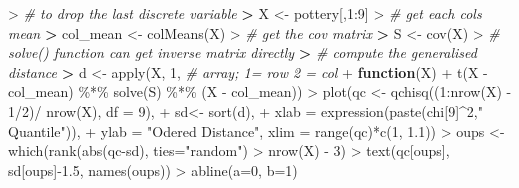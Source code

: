 \documentclass[
]{article}
\newenvironment{Shaded}{\begin{snugshade}}{\end{snugshade}}
\newcommand{\AttributeTok}[1]{\textcolor[rgb]{0.77,0.63,0.00}{#1}}
\newcommand{\CommentTok}[1]{\textcolor[rgb]{0.56,0.35,0.01}{\textit{#1}}}
\newcommand{\ControlFlowTok}[1]{\textcolor[rgb]{0.13,0.29,0.53}{\textbf{#1}}}
\newcommand{\DecValTok}[1]{\textcolor[rgb]{0.00,0.00,0.81}{#1}}
\newcommand{\ErrorTok}[1]{\textcolor[rgb]{0.64,0.00,0.00}{\textbf{#1}}}
\newcommand{\FloatTok}[1]{\textcolor[rgb]{0.00,0.00,0.81}{#1}}
\newcommand{\FunctionTok}[1]{\textcolor[rgb]{0.00,0.00,0.00}{#1}}
\newcommand{\NormalTok}[1]{#1}
\newcommand{\OtherTok}[1]{\textcolor[rgb]{0.56,0.35,0.01}{#1}}
\newcommand{\SpecialCharTok}[1]{\textcolor[rgb]{0.00,0.00,0.00}{#1}}
\newcommand{\StringTok}[1]{\textcolor[rgb]{0.31,0.60,0.02}{#1}}
\begin{document}
\begin{Shaded}
\begin{Highlighting}[]
\SpecialCharTok{\textgreater{}} \CommentTok{\# to drop the last discrete variable}
\ErrorTok{\textgreater{}}\NormalTok{ X }\OtherTok{\textless{}{-}}\NormalTok{ pottery[,}\DecValTok{1}\SpecialCharTok{:}\DecValTok{9}\NormalTok{]}
\SpecialCharTok{\textgreater{}} \CommentTok{\# get each col\textquotesingle{}s mean}
\ErrorTok{\textgreater{}}\NormalTok{ col\_mean }\OtherTok{\textless{}{-}}  \FunctionTok{colMeans}\NormalTok{(X)}
\SpecialCharTok{\textgreater{}} \CommentTok{\# get the cov matrix}
\ErrorTok{\textgreater{}}\NormalTok{ S }\OtherTok{\textless{}{-}} \FunctionTok{cov}\NormalTok{(X)}
\SpecialCharTok{\textgreater{}} \CommentTok{\# solve() function can get inverse matrix directly}
\ErrorTok{\textgreater{}} \CommentTok{\# compute the generalised distance}
\ErrorTok{\textgreater{}}\NormalTok{ d }\OtherTok{\textless{}{-}} \FunctionTok{apply}\NormalTok{(X, }\DecValTok{1}\NormalTok{, }\CommentTok{\# array; 1= row 2 = col}
\SpecialCharTok{+}            \ControlFlowTok{function}\NormalTok{(X) }
\SpecialCharTok{+}              \FunctionTok{t}\NormalTok{(X }\SpecialCharTok{{-}}\NormalTok{ col\_mean) }\SpecialCharTok{\%*\%} \FunctionTok{solve}\NormalTok{(S) }\SpecialCharTok{\%*\%}\NormalTok{ (X }\SpecialCharTok{{-}}\NormalTok{ col\_mean))}
\SpecialCharTok{\textgreater{}} \FunctionTok{plot}\NormalTok{(qc }\OtherTok{\textless{}{-}} \FunctionTok{qchisq}\NormalTok{((}\DecValTok{1}\SpecialCharTok{:}\FunctionTok{nrow}\NormalTok{(X) }\SpecialCharTok{{-}} \DecValTok{1}\SpecialCharTok{/}\DecValTok{2}\NormalTok{)}\SpecialCharTok{/} \FunctionTok{nrow}\NormalTok{(X), }\AttributeTok{df =} \DecValTok{9}\NormalTok{),}
\SpecialCharTok{+}\NormalTok{      sd}\OtherTok{\textless{}{-}} \FunctionTok{sort}\NormalTok{(d),}
\SpecialCharTok{+}      \AttributeTok{xlab =} \FunctionTok{expression}\NormalTok{(}\FunctionTok{paste}\NormalTok{(chi[}\DecValTok{9}\NormalTok{]}\SpecialCharTok{\^{}}\DecValTok{2}\NormalTok{,}\StringTok{" Quantile"}\NormalTok{)),}
\SpecialCharTok{+}      \AttributeTok{ylab =} \StringTok{"Odered Distance"}\NormalTok{, }\AttributeTok{xlim =} \FunctionTok{range}\NormalTok{(qc)}\SpecialCharTok{*}\FunctionTok{c}\NormalTok{(}\DecValTok{1}\NormalTok{, }\FloatTok{1.1}\NormalTok{))}
\SpecialCharTok{\textgreater{}}\NormalTok{ oups }\OtherTok{\textless{}{-}} \FunctionTok{which}\NormalTok{(}\FunctionTok{rank}\NormalTok{(}\FunctionTok{abs}\NormalTok{(qc}\SpecialCharTok{{-}}\NormalTok{sd), }\AttributeTok{ties=}\StringTok{"random"}\NormalTok{) }\SpecialCharTok{\textgreater{}} \FunctionTok{nrow}\NormalTok{(X) }\SpecialCharTok{{-}} \DecValTok{3}\NormalTok{)}
\SpecialCharTok{\textgreater{}} \FunctionTok{text}\NormalTok{(qc[oups], sd[oups]}\SpecialCharTok{{-}}\FloatTok{1.5}\NormalTok{, }\FunctionTok{names}\NormalTok{(oups))}
\SpecialCharTok{\textgreater{}} \FunctionTok{abline}\NormalTok{(}\AttributeTok{a=}\DecValTok{0}\NormalTok{, }\AttributeTok{b=}\DecValTok{1}\NormalTok{)}
\end{Highlighting}
\end{Shaded}
\end{document}
